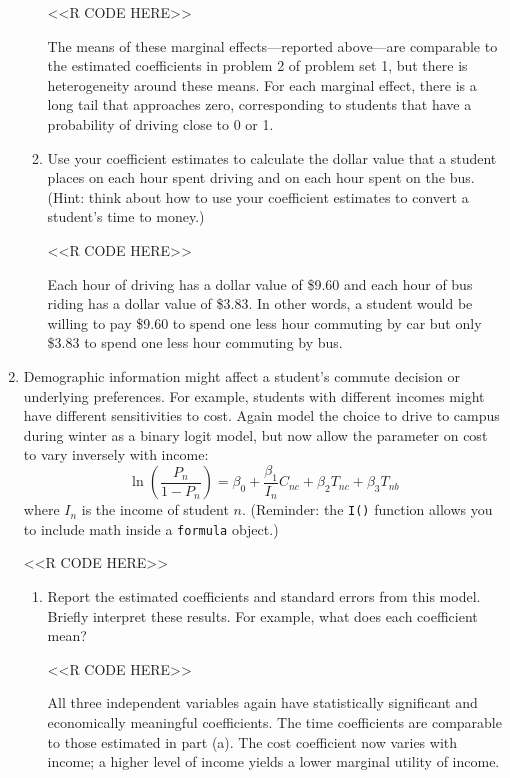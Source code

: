 \documentclass[11pt,letterpaper]{article}
\begin{document}
\begin{enumerate}[label=\alph*., leftmargin=*]
\begin{enumerate}[label=\roman*.]
		<<R CODE HERE>>

		The means of these marginal effects---reported above---are comparable to the estimated coefficients in problem 2 of problem set 1, but there is heterogeneity around these means. For each marginal effect, there is a long tail that approaches zero, corresponding to students that have a probability of driving close to 0 or 1.

		\item Use your coefficient estimates to calculate the dollar value that a student places on each hour spent driving and on each hour spent on the bus. (Hint: think about how to use your coefficient estimates to convert a student's time to money.)

		<<R CODE HERE>>

		Each hour of driving has a dollar value of \$9.60 and each hour of bus riding has a dollar value of \$3.83. In other words, a student would be willing to pay \$9.60 to spend one less hour commuting by car but only \$3.83 to spend one less hour commuting by bus.
	\end{enumerate}

	\item Demographic information might affect a student's commute decision or underlying preferences. For example, students with different incomes might have different sensitivities to cost. Again model the choice to drive to campus during winter as a binary logit model, but now allow the parameter on cost to vary inversely with income:
	$$\ln \left( \frac{P_n}{1 - P_n} \right) = \beta_0 + \frac{\beta_1}{I_n} C_{nc} + \beta_2 T_{nc} + \beta_3 T_{nb}$$
	where $I_n$ is the income of student $n$. (Reminder: the \texttt{I()} function allows you to include math inside a \texttt{formula} object.)

	<<R CODE HERE>>

	\begin{enumerate}[label=\roman*.]
		\item Report the estimated coefficients and standard errors from this model. Briefly interpret these results. For example, what does each coefficient mean?

		<<R CODE HERE>>

		All three independent variables again have statistically significant and economically meaningful coefficients. The time coefficients are comparable to those estimated in part (a). The cost coefficient now varies with income; a higher level of income yields a lower marginal utility of income. 


\end{enumerate}
\end{enumerate}
\end{document}
